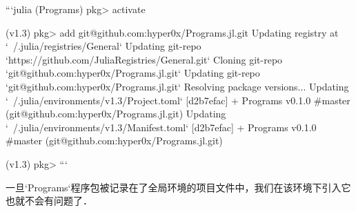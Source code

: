 ```julia
(Programs) pkg> activate

(v1.3) pkg> add git@github.com:hyper0x/Programs.jl.git
  Updating registry at `~/.julia/registries/General`
  Updating git-repo `https://github.com/JuliaRegistries/General.git`
   Cloning git-repo `git@github.com:hyper0x/Programs.jl.git`
  Updating git-repo `git@github.com:hyper0x/Programs.jl.git`
 Resolving package versions...
  Updating `~/.julia/environments/v1.3/Project.toml`
  [d2b7efac] + Programs v0.1.0 #master (git@github.com:hyper0x/Programs.jl.git)
  Updating `~/.julia/environments/v1.3/Manifest.toml`
  [d2b7efac] + Programs v0.1.0 #master (git@github.com:hyper0x/Programs.jl.git)

(v1.3) pkg> 
```

一旦`Programs`程序包被记录在了全局环境的项目文件中，我们在该环境下引入它也就不会有问题了．